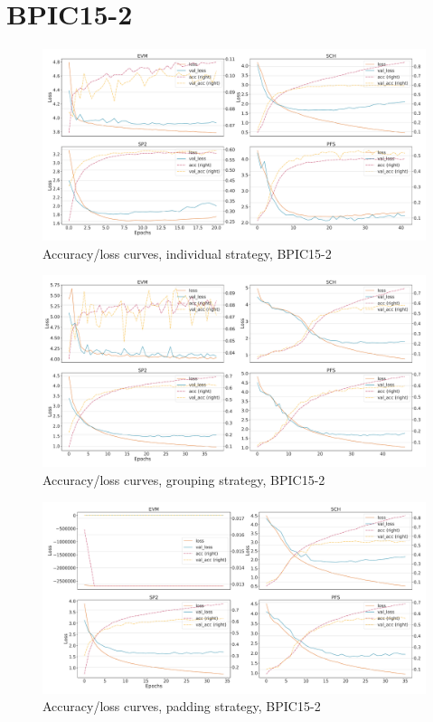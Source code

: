 \section*{BPIC15-2}
\begin{figure}[!htb]
    \centering
    \includegraphics[width=\textwidth]{gfx/bpic2015_2/individual_loss_acc_curve.pdf}
    \caption{Accuracy/loss curves, individual strategy, BPIC15-2}
\end{figure}
\begin{figure}[!htb]
    \centering
    \includegraphics[width=\textwidth]{gfx/bpic2015_2/grouped_loss_acc_curve.pdf}
    \caption{Accuracy/loss curves, grouping strategy, BPIC15-2}
\end{figure}
\begin{figure}[!htb]
    \centering
    \includegraphics[width=\textwidth]{gfx/bpic2015_2/padded_loss_acc_curve.pdf}
    \caption{Accuracy/loss curves, padding strategy, BPIC15-2}
\end{figure}
